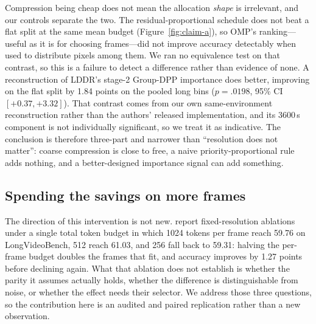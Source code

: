 \documentclass[11pt]{article}
\begin{document}
Compression being cheap does not mean the allocation \emph{shape} is irrelevant, and our controls separate the two.
The residual-proportional schedule does not beat a flat split at the same mean budget (Figure~\ref{fig:claim-a}), so OMP's ranking---useful as it is for choosing frames---did not improve accuracy detectably when used to distribute pixels among them. We ran no equivalence test on that contrast, so this is a failure to detect a difference rather than evidence of none.
A reconstruction of LDDR's stage-2 Group-DPP importance does better, improving on the flat split by 1.84 points on the pooled long bins ($p{=}.0198$, 95\% CI $[+0.37,+3.32]$).
That contrast comes from our own same-environment reconstruction rather than the authors' released implementation, and its 3600\,s component is not individually significant, so we treat it as indicative.
The conclusion is therefore three-part and narrower than ``resolution does not matter'': coarse compression is close to free, a naive priority-proportional rule adds nothing, and a better-designed importance signal can add something.

\subsection{Spending the savings on more frames}
\label{sec:reinvest}

The direction of this intervention is not new.
\citet{chen2026lddr} report fixed-resolution ablations under a single total token budget in which 1024 tokens per frame reach 59.76 on LongVideoBench, 512 reach 61.03, and 256 fall back to 59.31: halving the per-frame budget doubles the frames that fit, and accuracy improves by 1.27 points before declining again.
What that ablation does not establish is whether the parity it assumes actually holds, whether the difference is distinguishable from noise, or whether the effect needs their selector.
We address those three questions, so the contribution here is an audited and paired replication rather than a new observation.
\end{document}
